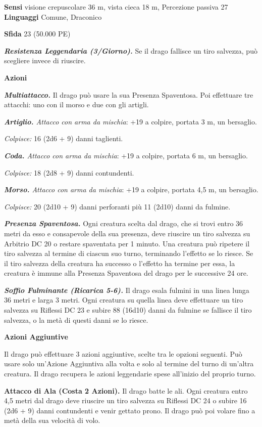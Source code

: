\begin{multicols}{2}
\textbf{Sensi} visione crepuscolare 36 m, vista cieca 18 m, Percezione passiva
27 \textbf{Linguaggi} Comune, Draconico

\textbf{Sfida} 23 (50.000 PE)

\emph{\textbf{Resistenza Leggendaria (3/Giorno).}} Se il drago fallisce
un tiro salvezza, può scegliere invece di riuscire.

\textbf{Azioni}

\emph{\textbf{Multiattacco.}} Il drago può usare la sua Presenza
Spaventosa. Poi effettuare tre attacchi: uno con il morso e due con gli
artigli.

\emph{\textbf{Artiglio.} Attacco con arma da mischia}: +19 a colpire,
portata 3 m, un bersaglio.

\emph{Colpisce:} 16 (2d6 + 9) danni taglienti.

\emph{\textbf{Coda.} Attacco con arma da mischia}: +19 a colpire,
portata 6 m, un bersaglio.

\emph{Colpisce:} 18 (2d8 + 9) danni contundenti.

\emph{\textbf{Morso.} Attacco con arma da mischia}: +19 a colpire,
portata 4,5 m, un bersaglio.

\emph{Colpisce:} 20 (2d10 + 9) danni perforanti più 11 (2d10) danni da
fulmine.

\emph{\textbf{Presenza Spaventosa.}} Ogni creatura scelta dal drago, che
si trovi entro 36 metri da esso e consapevole della sua presenza, deve
riuscire un tiro salvezza su Arbitrio DC 20 o restare spaventata per 1
minuto. Una creatura può ripetere il tiro salvezza al termine di ciascun
suo turno, terminando l'effetto se lo riesce. Se il tiro salvezza della
creatura ha successo o l'effetto ha termine per essa, la creatura è
immune alla Presenza Spaventosa del drago per le successive 24 ore.

\emph{\textbf{Soffio Fulminante (Ricarica 5-6).}} Il drago esala fulmini
in una linea lunga 36 metri e larga 3 metri. Ogni creatura su quella
linea deve effettuare un tiro salvezza su Riflessi DC 23 e subire 88
(16d10) danni da fulmine se fallisce il tiro salvezza, o la metà di
questi danni se lo riesce.

\textbf{Azioni Aggiuntive}

Il drago può effettuare 3 azioni aggiuntive, scelte tra le opzioni
seguenti. Può usare solo un'Azione Aggiuntiva alla volta e solo al
termine del turno di un'altra creatura. Il drago recupera le azioni
leggendarie spese all'inizio del proprio turno.

\textbf{Attacco di Ala (Costa 2 Azioni).} Il drago batte le ali. Ogni
creatura entro 4,5 metri dal drago deve riuscire un tiro salvezza su Riflessi DC 24 o subire 16 (2d6 + 9) danni contundenti e venir gettato
prono. Il drago può poi volare fino a metà della sua velocità di volo.


\end{multicols}
